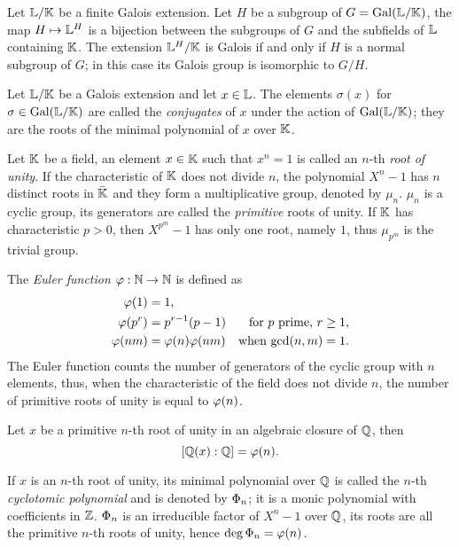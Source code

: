 \begin{theorem}
  Let $\mathbb{L}/\mathbb{K}$ be a finite Galois extension. Let $H$ be a subgroup of
  $G=\operatorname{Gal}(\mathbb{L}/\mathbb{K})$, the map $H\mapsto \mathbb{L}^H$ is a bijection between
  the subgroups of $G$ and the subfields of $\mathbb{L}$ containing $\mathbb{K}$. The
  extension $\mathbb{L}^H/\mathbb{K}$ is Galois if and only if $H$ is a normal
  subgroup of $G$; in this case its Galois group is isomorphic to
  $G/H$.
\end{theorem}

Let $\mathbb{L}/\mathbb{K}$ be a Galois extension and let $x\in\mathbb{L}$. The elements
$\sigma(x)$ for $\sigma\in\operatorname{Gal}(\mathbb{L}/\mathbb{K})$ are called the
\textit{conjugates} of $x$ under the action
of $\operatorname{Gal}(\mathbb{L}/\mathbb{K})$; they are the roots of the minimal polynomial of $x$
over $\mathbb{K}$.

Let $\mathbb{K}$ be a field, an element $x\in \mathbb{K}$ such that $x^n=1$ is called
an $n$-th \textit{root of unity}. If the
characteristic of $\mathbb{K}$ does not divide $n$, the polynomial $X^n-1$ has
$n$ distinct roots in $\bar{\mathbb{K}}$ and they form a multiplicative
group, denoted by $\mu_n$. $\mu_n$ is a cyclic group, its generators
are called the  \textit{primitive}
roots of unity.  If $\mathbb{K}$ has characteristic $p>0$, then $X^{p^m}-1$
has only one root, namely $1$, thus $\mu_{p^m}$ is the trivial group.

The \textit{Euler function}
$\varphi:\mathbb{N}\rightarrow\mathbb{N}$ is
defined as
\begin{align*}
  \varphi(1) &= 1\text{,}\\
  \varphi(p^r) &= p^{r-1}(p-1) &\text{for $p$ prime, $r\ge1$,}\\
  \varphi(nm) &= \varphi(n)\varphi(nm) &\text{when $\gcd(n,m)=1$.}
\end{align*}
The Euler function counts the number of generators of the cyclic group
with $n$ elements, thus, when the characteristic of the field does not
divide $n$, the number of primitive roots of unity is equal to $\varphi(n)$.

\begin{theorem}
  Let $x$ be a primitive $n$-th root of unity in an algebraic closure
  of $\mathbb{Q}$, then
  \[[\mathbb{Q}(x):\mathbb{Q}]=\varphi(n)\text{.}\]
\end{theorem}

If $x$ is an $n$-th root of unity, its minimal polynomial over $\mathbb{Q}$ is
called the $n$-th \textit{cyclotomic
  polynomial} and is denoted by
$\Phi_n$;
it is a monic polynomial with coefficients in $\mathbb{Z}$. $\Phi_n$ is an
irreducible factor of $X^n-1$ over $\mathbb{Q}$, its roots are all the
primitive $n$-th roots of unity, hence $\deg\Phi_n=\varphi(n)$.

